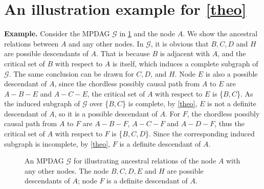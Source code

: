 \documentclass{article}
\begin{document}
\section{An illustration example for \cref{theo}} \label{Appendix: An illustration Example}

\textbf{Example.} Consider the MPDAG $\mathcal{G}$ in \cref{fig: eg1} and the node $A$. We show the ancestral relations between $A$ and any other nodes. In $\mathcal{G}$, it is obvious that $B,C,D$ and $H$ are possible descendants of $A$. That is because $B$ is adjacent with $A$, and the critical set of $B$ with respect to $A$ is itself, which induces a complete subgraph of $\mathcal{G}$. The same conclusion can be drawn for $C,D$, and $H$.  Node $E$ is also a possible descendant of $A$, since the chordless possibly causal path from $A$ to $E$ are $A-B-E$ and $A-C-E$, the critical set of $A$ with respect to $E$ is \{$B,C$\}. As the induced subgraph of $\mathcal{G}$ over \{$B,C$\} is complete, by \cref{theo}, $E$ is not a definite descendant of $A$, so it is a possible descendant of $A$. For $F$, the chordless possibly causal path from $A$ to $F$ are $A-B-F$, $A-C-F$ and $A-D-F$, thus the critical set of $A$ with respect to $F$ is \{$B,C,D$\}. Since the corresponding induced subgraph is incomplete, by \cref{theo}, $F$ is a definite descendant of $A$.

\begin{figure}[htp]
\begin{center}
\caption{An MPDAG $\mathcal{G}$ for illustrating ancestral relations of the node $A$ with any other nodes. The node $B,C,D,E$ and $H$ are possible descendants of $A$; node $F$ is a definite descendant of $A$.}
\label{fig: eg1}
\end{center}
\end{figure}
\end{document}

